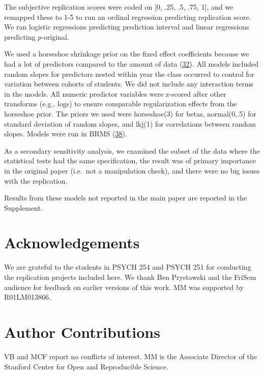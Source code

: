 \documentclass[
  english,
  a4paper,
]{article}
\begin{document}
The subjective replication scores were coded on {[}0, .25, .5, .75, 1{]}, and we remapped these to 1-5 to run an ordinal regression predicting replication score. We ran logistic regressions predicting prediction interval and linear regressions predicting \(p\)-original.

We used a horseshoe shrinkage prior on the fixed effect coefficients because we had a lot of predictors compared to the amount of data (\protect\hyperlink{ref-carvalho09}{32}). All models included random slopes for predictors nested within year the class occurred to control for variation between cohorts of students. We did not include any interaction terms in the models. All numeric predictor variables were z-scored after other transforms (e.g., logs) to ensure comparable regularization effects from the horseshoe prior. The priors we used were horseshoe(3) for betas, normal(0,.5) for standard deviation of random slopes, and lkj(1) for correlations between random slopes. Models were run in BRMS (\protect\hyperlink{ref-brms}{38}).

As a secondary sensitivity analysis, we examined the subset of the data where the statistical tests had the same specification, the result was of primary importance in the original paper (i.e.~not a manipulation check), and there were no big issues with the replication.

Results from these models not reported in the main paper are reported in the Supplement.

\hypertarget{acknowledgements}{%
\section*{Acknowledgements}\label{acknowledgements}}

We are grateful to the students in PSYCH 254 and PSYCH 251 for conducting the replication projects included here. We thank Ben Prystawski and the FriSem audience for feedback on earlier versions of this work. MM was supported by R01LM013866.

\hypertarget{author-contributions}{%
\section*{Author Contributions}\label{author-contributions}}

VB and MCF report no conflicts of interest. MM is the Associate Director of the Stanford Center for Open and Reproducible Science.
\end{document}
